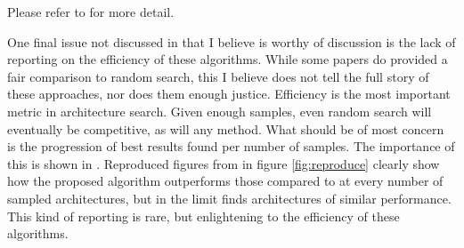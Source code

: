 Please refer to \citet{Li} for more detail.

One final issue not discussed in \citet{Li} that I believe is worthy of discussion is the lack of reporting on the efficiency of these algorithms. While some papers do provided a fair comparison to random search, this I believe does not tell the full story of these approaches, nor does them enough justice. Efficiency is the most important metric in architecture search. Given enough samples, even random search will eventually be competitive, as will any method. What should be of most concern is the progression of best results found per number of samples. The importance of this is shown in \citet{Jin2018,negrinho2017deeparchitect}. Reproduced figures from \cite{Jin2018} in figure \ref{fig:reproduce} clearly show how the proposed algorithm outperforms those compared to at every number of sampled architectures, but in the limit finds architectures of similar performance. This kind of reporting is rare, but enlightening to the efficiency of these algorithms.

